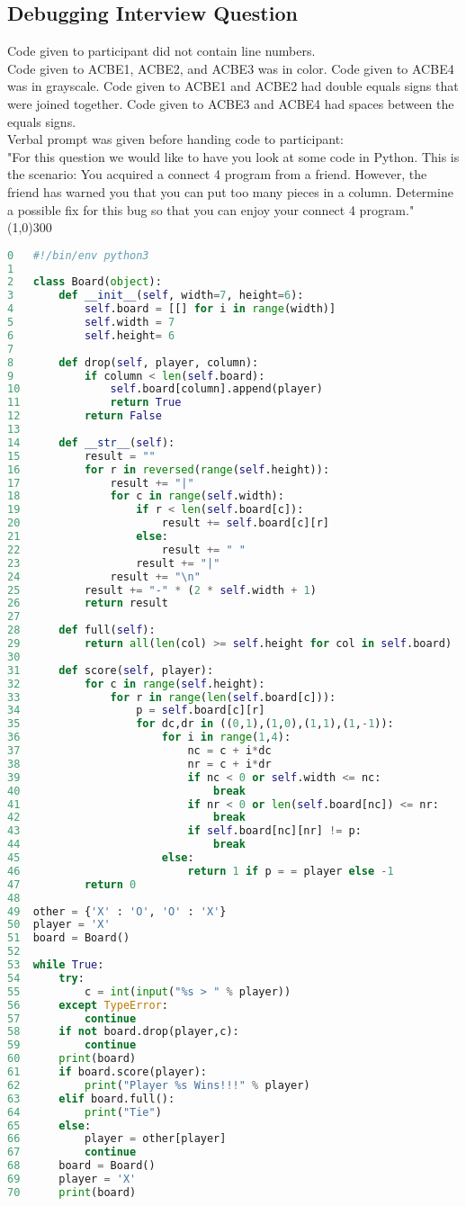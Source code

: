 \subsection{Debugging Interview Question}\label{sec-debug-q}
Code given to participant did not contain line numbers. \\
Code given to ACBE1, ACBE2, and ACBE3 was in color. Code given to ACBE4 was in grayscale. 
Code given to ACBE1 and ACBE2 had double equals signs that were joined together.
Code given to ACBE3 and ACBE4 had spaces between the equals signs. \\
Verbal prompt was given before handing code to participant: \\
"For this question we would like to have you look at some code in Python.
This is the scenario: You acquired a connect 4 program from a friend.
However, the friend has warned you that you can put too many pieces in a column.
Determine a possible fix for this bug so that you can enjoy your connect 4 program." \\
\line(1,0){300}
\begin{lstlisting}[language=python]
0 	#!/bin/env python3
1
2 	class Board(object):
3 		def __init__(self, width=7, height=6):
4 			self.board = [[] for i in range(width)]
5 			self.width = 7
6 			self.height= 6
7 	
8 		def drop(self, player, column):
9 			if column < len(self.board):
10				self.board[column].append(player)
11				return True
12			return False
13	
14		def __str__(self):
15			result = ""
16			for r in reversed(range(self.height)):
17				result += "|"
18				for c in range(self.width):
19					if r < len(self.board[c]):
20						result += self.board[c][r]
21					else:
22						result += " "
23					result += "|"
24				result += "\n"
25			result += "-" * (2 * self.width + 1)
26			return result
27	
28		def full(self):
29			return all(len(col) >= self.height for col in self.board)
30	
31		def score(self, player):
32			for c in range(self.height):
33				for r in range(len(self.board[c])):
34					p = self.board[c][r]
35					for dc,dr in ((0,1),(1,0),(1,1),(1,-1)):
36						for i in range(1,4):
37							nc = c + i*dc
38							nr = c + i*dr
39							if nc < 0 or self.width <= nc:
40								break
41							if nr < 0 or len(self.board[nc]) <= nr:
42								break
43							if self.board[nc][nr] != p:
44								break
45						else:
46							return 1 if p = = player else -1
47			return 0
48
49	other = {'X' : 'O', 'O' : 'X'}
50	player = 'X'
51	board = Board()
52
53	while True:
54		try:
55			c = int(input("%s > " % player))
56		except TypeError:
57			continue
58		if not board.drop(player,c):
59			continue
60		print(board)
61		if board.score(player):
62			print("Player %s Wins!!!" % player)
63		elif board.full():
64			print("Tie")
65		else:
66			player = other[player]
67			continue
68		board = Board()
69		player = 'X'
70		print(board)
\end{lstlisting}

